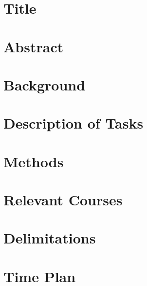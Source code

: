 \documentclass[a4, 12pt]{article}
\begin{document}
\newpage

\setcounter{page}{2}
\tableofcontents
\newpage

\section{Title}
\section{Abstract}
\section{Background}
\section{Description of Tasks}
\section{Methods}
\section{Relevant Courses}
\section{Delimitations}
\section{Time Plan}



\end{document}
